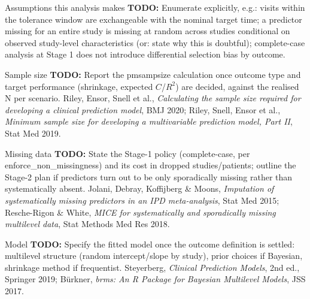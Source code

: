 \documentclass[11pt, t, handout]{beamer}
\newcommand{\todo}[1]{\textcolor{red!70!black}{\textbf{TODO:} #1}}
\begin{document}
\begin{frame}{Assumptions this analysis makes}
  \pause
  \todo{Enumerate explicitly, e.g.: visits within the tolerance window are
  exchangeable with the nominal target time; a predictor missing for an
  entire study is missing at random across studies conditional on
  observed study-level characteristics (or: state why this is doubtful);
  complete-case analysis at Stage 1 does not introduce differential
  selection bias by outcome.}
\end{frame}

\begin{frame}{Sample size}
  \pause
  \todo{Report the pmsampsize calculation once outcome type and target
  performance (shrinkage, expected $C$/$R^2$) are decided, against the
  realised N per scenario.}
  \vspace{8pt}
  \pause
  {\footnotesize Riley, Ensor, Snell et al., \emph{Calculating the sample
   size required for developing a clinical prediction model}, BMJ 2020;
   Riley, Snell, Ensor et al., \emph{Minimum sample size for developing a
   multivariable prediction model, Part II}, Stat Med 2019.}
\end{frame}

\begin{frame}{Missing data}
  \pause
  \todo{State the Stage-1 policy (complete-case, per
  enforce\_non\_missingness) and its cost in dropped studies/patients;
  outline the Stage-2 plan if predictors turn out to be only
  sporadically missing rather than systematically absent.}
  \vspace{8pt}
  \pause
  {\footnotesize Jolani, Debray, Koffijberg \& Moons, \emph{Imputation of
   systematically missing predictors in an IPD meta-analysis}, Stat Med
   2015; Resche-Rigon \& White, \emph{MICE for systematically and
   sporadically missing multilevel data}, Stat Methods Med Res 2018.}
\end{frame}

\begin{frame}{Model}
  \pause
  \todo{Specify the fitted model once the outcome definition is settled:
  multilevel structure (random intercept/slope by study), prior choices
  if Bayesian, shrinkage method if frequentist.}
  \vspace{8pt}
  \pause
  {\footnotesize Steyerberg, \emph{Clinical Prediction Models}, 2nd ed.,
   Springer 2019; B\"urkner, \emph{brms: An R Package for Bayesian
   Multilevel Models}, JSS 2017.}
\end{frame}
\end{document}
